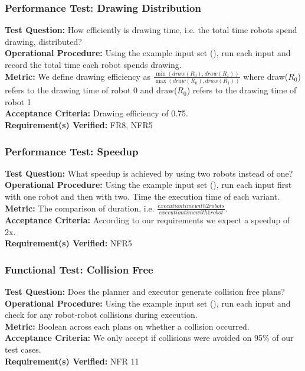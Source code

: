 \subsubsection{Performance Test: Drawing Distribution}
\label{test:sdp_pt_draw}
\textbf{Test Question:} How efficiently is drawing time, i.e. the total time robots spend drawing, distributed? \\
\textbf{Operational Procedure:} Using the example input set (), run each input and record the total time each robot spends drawing. \\
\textbf{Metric:} We define drawing efficiency as $\frac{\min(draw(R_{0}), draw(R_{1}))}{\max(draw(R_{0}), draw(R_{1}))}$ where draw($R_{0}$) refers to the drawing time of robot 0 and draw($R_{0}$) refers to the drawing time of robot 1\\
\textbf{Acceptance Criteria:} Drawing efficiency of 0.75.\\
\textbf{Requirement(s) Verified:} FR8, NFR5 \\

\subsubsection{Performance Test: Speedup}
\label{test:sdp_pt_speedup}
\textbf{Test Question:} What speedup is achieved by using two robots instead of one?\\
\textbf{Operational Procedure:} Using the example input set (), run each input first with one robot and then with two. Time the execution time of each variant.\\
\textbf{Metric:} The comparison of duration, i.e. $\frac{execution time with 2 robots}{execution time with 1 robot}$. \\
\textbf{Acceptance Criteria:} According to our requirements we expect a speedup of 2x. \\
\textbf{Requirement(s) Verified:} NFR5

\subsubsection{Functional Test: Collision Free}
\label{test:sdp_ft_collision}
\textbf{Test Question:} Does the planner and executor generate collision free plans?\\
\textbf{Operational Procedure:} Using the example input set (), run each input and check for any robot-robot collisions during execution. \\
\textbf{Metric:} Boolean across each plans on whether a collision occurred.\\
\textbf{Acceptance Criteria:} We only accept if collisions were avoided on 95\% of our test cases. \\
\textbf{Requirement(s) Verified:} NFR 11 \\

